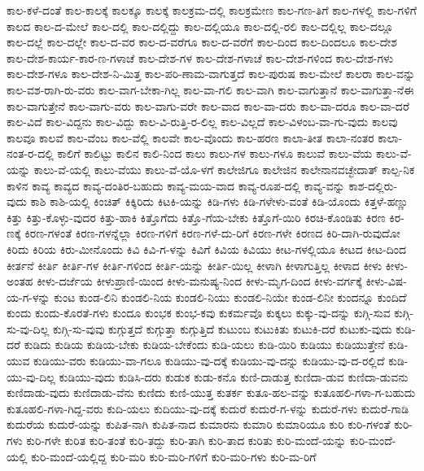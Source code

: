 {ಕಾಲ-ಕಳೆ-ದಂತೆ
ಕಾಲ-ಕಾಲಕ್ಕೆ
ಕಾಲಕ್ಕೂ
ಕಾಲಕ್ಕೆ
ಕಾಲಕ್ರಮ-ದಲ್ಲಿ
ಕಾಲಕ್ರಮೇಣ
ಕಾಲ-ಗಣ-ತಿಗೆ
ಕಾಲ-ಗಳಲ್ಲಿ
ಕಾಲ-ಗಳಿಗೆ
ಕಾಲದ
ಕಾಲ-ದ-ಮೇಲೆ
ಕಾಲ-ದಲ್ಲಿ
ಕಾಲ-ದಲ್ಲಿದ್ದು
ಕಾಲ-ದಲ್ಲಿಯೂ
ಕಾಲ-ದಲ್ಲಿ-ರಲಿ
ಕಾಲ-ದಲ್ಲಿಲ್ಲ
ಕಾಲ-ದಲ್ಲೂ
ಕಾಲ-ದಲ್ಲೆ
ಕಾಲ-ದಲ್ಲೇ
ಕಾಲ-ದ-ವರ
ಕಾಲ-ದ-ವರೆಗೂ
ಕಾಲ-ದ-ವರೆಗೆ
ಕಾಲ-ದಿಂದ
ಕಾಲ-ದಿಂದಲೂ
ಕಾಲ-ದೇಶ
ಕಾಲ-ದೇಶ-ಕಾರ್ಯ-ಕಾರ-ಣ-ಗಳಾಚೆ
ಕಾಲ-ದೇಶ-ಗಳ
ಕಾಲ-ದೇಶ-ಗಳಾಚೆ
ಕಾಲ-ದೇಶ-ಗಳಿಂದ
ಕಾಲ-ದೇಶ-ಗಳು
ಕಾಲ-ದೇಶ-ಗಳೂ
ಕಾಲ-ದೇಶ-ನಿ-ಮಿತ್ತ
ಕಾಲ-ಪರಿ-ಣಾಮ-ವಾಗುತ್ತದೆ
ಕಾಲ-ಪುರುಷ
ಕಾಲ-ಮೇಲೆ
ಕಾಲರಾ
ಕಾಲ-ವನ್ನು
ಕಾಲ-ವಶ-ರಾಗಿ-ರು-ವರು
ಕಾಲ-ವಾಗ-ಬೇಕಾ-ಗಿಲ್ಲ
ಕಾಲ-ವಾ-ಗಲಿ
ಕಾಲ-ವಾಗಿ
ಕಾಲ-ವಾಗುತ್ತಾನೆ
ಕಾಲ-ವಾಗುತ್ತಾ-ನೆಈ
ಕಾಲ-ವಾಗುತ್ತೇನೆ
ಕಾಲ-ವಾಗು-ವರು
ಕಾಲ-ವಾಗು-ವರೇ
ಕಾಲ-ವಾದ
ಕಾಲ-ವಾ-ದರು
ಕಾಲ-ವಾ-ದರೂ
ಕಾಲ-ವಾ-ದರೆ
ಕಾಲ-ವಿದೆ
ಕಾಲ-ವಿದ್ದನು
ಕಾಲ-ವಿದ್ದು
ಕಾಲ-ವಿ-ರುತ್ತಿ-ರ-ಲಿಲ್ಲ
ಕಾಲ-ವಿಲ್ಲದೆ
ಕಾಲ-ವಿಳಂಬ-ವಾ-ಗು-ವುದು
ಕಾಲವು
ಕಾಲವೂ
ಕಾಲವೆ
ಕಾಲ-ವೆಂಬ
ಕಾಲ-ವೆಲ್ಲಿ
ಕಾಲವೇ
ಕಾಲ-ವೊಂದು
ಕಾಲ-ಹರಣ
ಕಾಲಾ-ತೀತ
ಕಾಲಾ-ನಂತರ
ಕಾಲಾ-ನಂತ-ರ-ದಲ್ಲಿ
ಕಾಲಿಗೆ
ಕಾಲಿಟ್ಟು
ಕಾಲಿನ
ಕಾಲಿ-ನಿಂದ
ಕಾಲು
ಕಾಲು-ಗಳ
ಕಾಲು-ಗಳೂ
ಕಾಲುವೆ
ಕಾಲು-ವೆಯ
ಕಾಲು-ವೆ-ಯನ್ನು
ಕಾಲು-ವೆ-ಯಲ್ಲಿ
ಕಾಲು-ವೆಯು
ಕಾಲು-ವೆ-ಯೊ-ಳಗೆ
ಕಾಲೇಜಿಗೂ
ಕಾಲೇಜಿನ
ಕಾಲೇನಾನವಚ್ಛೇದಾತ್
ಕಾಲ್ಪ-ನಿಕ
ಕಾಳಿನ
ಕಾವ್ಯ
ಕಾವ್ಯದ
ಕಾವ್ಯ-ದಂತಿರ-ಬಹುದು
ಕಾವ್ಯ-ಮಯ-ವಾದ
ಕಾವ್ಯ-ರೂಪ-ದಲ್ಲಿ
ಕಾವ್ಯ-ವನ್ನು
ಕಾಶ-ದಲ್ಲಿರು-ವುದು
ಕಾಶಿ
ಕಾಶಿ-ಯಲ್ಲಿ
ಕಿಂಚಿತ್
ಕಿಕ್ಕಿರಿದು
ಕಿಟಕಿ-ಯನ್ನು
ಕಿಡಿ-ಗಳು
ಕಿಡಿ-ಗಳೇಳು-ವಂತೆ
ಕಿಡಿ-ಯೊಂದು
ಕಿತ್ತಳೆ-ಹಣ್ಣು
ಕಿತ್ತು
ಕಿತ್ತು-ಕೊಳ್ಳು-ವುದರ
ಕಿತ್ತು-ಹಾಕಿ
ಕಿತ್ತೊಗೆದು
ಕಿತ್ತೊ-ಗೆಯ-ಬೇಕು
ಕಿತ್ತೊಗೆ-ಯಿರಿ
ಕಿರಚಿ-ಕೊಂಡಿತು
ಕಿರಣ
ಕಿರ-ಣಕ್ಕೆ
ಕಿರಣ-ಗಳಂತೆ
ಕಿರಣ-ಗಳನ್ನೆಲ್ಲಾ
ಕಿರಣ-ಗಳಿಗೆ
ಕಿರಣ-ಗಳೆ-ದು-ರಿಗೆ
ಕಿರಣ-ಗಳೇ
ಕಿರಣದ
ಕಿರಿ-ದಾಗಿ-ರುವುದೋ
ಕಿರಿದು
ಕಿರಿಯ
ಕಿರು-ಮೀನೊಂದು
ಕಿವಿ
ಕಿವಿ-ಗ-ಳನ್ನು
ಕಿವಿಗೆ
ಕಿವಿಯ
ಕಿವಿಯು
ಕೀಟ-ಗಳಲ್ಲಿಯೂ
ಕೀಟದ
ಕೀಟ-ದಿಂದ
ಕೀರ್ತನೆ
ಕೀರ್ತಿ
ಕೀರ್ತಿ-ಗಳ
ಕೀರ್ತಿ-ಗಳಿಂದ
ಕೀರ್ತಿ-ಯನ್ನು
ಕೀರ್ತಿ-ಯಿಲ್ಲ
ಕೀಳಾಗಿ
ಕೀಳಾಗುತ್ತಿಲ್ಲ
ಕೀಳಾದ
ಕೀಳು
ಕೀಳು-ಅಂತಹ
ಕೀಳು-ದರ್ಜೆಯ
ಕೀಳುಪ್ರಾಣಿ-ಯಿಂದ
ಕೀಳು-ಮನುಷ್ಯ-ನಿಂದ
ಕೀಳು-ಮೃಗ-ದಿಂದ
ಕೀಳು-ವರ್ಗಕ್ಕೆ
ಕೀಳು-ವಿಷ-ಯ-ಗ-ಳನ್ನು
ಕುಂಟ
ಕುಂಡ-ಲಿನಿ
ಕುಂಡಲಿ-ನಿಯ
ಕುಂಡಲಿ-ನಿಯು
ಕುಂಡಲಿ-ನಿಯೇ
ಕುಂಡ-ಲಿನೀ
ಕುಂದನ್ನೂ
ಕುಂದಿದೆ
ಕುಂದು
ಕುಂದು-ಕೊರತೆ-ಗಳು
ಕುಂದೂ
ಕುಂಭಕ
ಕುಂಭ-ಕವು
ಕುಕರ್ಮವೊ
ಕುಕ್ಕಲು
ಕುಕ್ಕು-ವು-ದನ್ನು
ಕುಗ್ಗಿ-ಸುವ
ಕುಗ್ಗಿ-ಸು-ವು-ದಿಲ್ಲ
ಕುಗ್ಗಿ-ಸು-ವುವು
ಕುಗ್ಗುತ್ತದೆ
ಕುಗ್ಗುತ್ತಾ
ಕುಗ್ಗುತ್ತಿದೆ
ಕುಟುಂಬ
ಕುಟುಕಿತು
ಕುಟುಕಿ-ದರೆ
ಕುಟುಕು-ವುದು
ಕುಡಿ-ದರೆ
ಕುಡಿದು
ಕುಡಿಯ
ಕುಡಿಯ-ಬೇಕು
ಕುಡಿಯ-ಬೇಕೆಂದು
ಕುಡಿ-ಯಲು
ಕುಡಿ-ಯಿರಿ
ಕುಡಿಯು
ಕುಡಿಯುತ್ತೇನೆ
ಕುಡಿ-ಯುವ
ಕುಡಿಯು-ವರು
ಕುಡಿಯು-ವಾ-ಗಲೂ
ಕುಡಿಯು-ವು-ದಕ್ಕೆ
ಕುಡಿಯು-ವು-ದನ್ನು
ಕುಡಿಯು-ವು-ದ-ರಲ್ಲಿದೆ
ಕುಡಿ-ಯು-ವು-ದಿಲ್ಲ
ಕುಡಿಯು-ವುದು
ಕುಡಿಸಿ-ದರು
ಕುಡುಕ
ಕುಡು-ಕನೊ
ಕುಣಿ-ದಾಡುತ್ತ
ಕುಣಿದಾ-ಡುವ
ಕುಣಿದಾ-ಡುವನು
ಕುಣಿದಾಡು-ವುದು
ಕುಣಿದಾಡು-ವೆನು
ಕುಣಿದು
ಕುಣಿ-ಯುತ್ತ
ಕುತರ್ಕ
ಕುತೂ-ಹಲ-ವನ್ನು
ಕುತೂಹಲಿ-ಗಳಾ-ಗ-ಬಹುದು
ಕುತೂಹಲಿ-ಗಳಾ-ಗಿದ್ದ-ವರು
ಕುದಿ-ಯಲು
ಕುದಿಯು-ವು-ದಕ್ಕೆ
ಕುದುರೆ
ಕುದುರೆ-ಗ-ಳನ್ನು
ಕುದುರೆ-ಗಳು
ಕುದುರೆ-ಗಾಡಿ
ಕುದುರೆಯ
ಕುದುರೆ-ಯನ್ನು
ಕುಪಿತ-ನಾಗಿ
ಕುಪಿತ-ನಾದ
ಕುಮಾರನು
ಕುಮಾರಿ
ಕುಮಾರಿಯೂ
ಕುರಿ
ಕುರಿ-ಗಳಂತೆ
ಕುರಿ-ಗಳು
ಕುರಿ-ಗಳೇ
ಕುರಿತ
ಕುರಿ-ತಂತೆ
ಕುರಿ-ತದ್ದು
ಕುರಿ-ತಾಗಿ
ಕುರಿ-ತಾದ
ಕುರಿತು
ಕುರಿ-ಮಂದೆ-ಯನ್ನು
ಕುರಿ-ಮಂದೆ-ಯಲ್ಲಿ
ಕುರಿ-ಮಂದೆ-ಯಲ್ಲಿದ್ದ
ಕುರಿ-ಮರಿ
ಕುರಿ-ಮರಿ-ಗಳಿಗೆ
ಕುರಿ-ಮರಿ-ಗಳು
ಕುರಿ-ಮ-ರಿಗೆ
}
